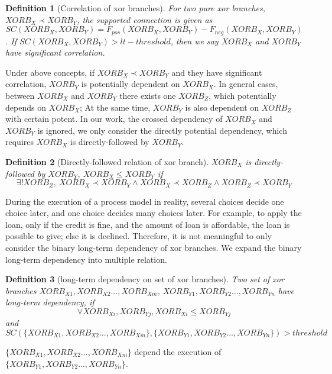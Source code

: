 \documentclass[]{article}
\newtheorem{mydef}{Definition}[section]
\begin{document}
\begin{mydef}[Correlation of xor branches]
	\label{def: supported-connection}
For two pure xor branches, $XORB_X \prec XORB_Y$, the supported connection is given as \[SC(XORB_X,XORB_Y)= F_{pos}(XORB_X, XORB_Y) -F_{neg}(XORB_X, XORB_Y)\]. If $SC(XORB_X,XORB_Y) > lt-threshold$, then we say $XORB_X$ and $XORB_Y$ have significant correlation.
\end{mydef}
Under above concepts, if $XORB_X \prec XORB_Y$ and they have significant correlation,  $XORB_Y$ is potentially dependent on  $XORB_X$. In general cases, between $XORB_X$ and $XORB_Y$ there exists one $XORB_Z$, which potentially depends on $XORB_X$; At the same time, $XORB_Y$ is also dependent on $XORB_Z$ with certain potent. In our work, the crossed dependency of $XORB_X$ and $XORB_Y$ is ignored, we only consider the directly potential dependency, which requires $XORB_X$ is directly-followed by $XORB_Y$. 
\begin{mydef}[Directly-followed relation of xor branch]
	$XORB_X$ is directly-followed by $XORB_Y$, $XORB_X \leq XORB_Y$ if 
	\[ \exists ! XORB_Z, \: XORB_X \prec XORB_Y \land XORB_X \prec XORB_Z \land XORB_Z \prec XORB_Y \]
\end{mydef}

During the execution of a process model in reality, several choices decide one choice later, and one choice decides many choices later. For example, to apply the loan, only if the credit is fine, and the amount of loan is affordable, the loan is possible to give; else it is declined. Therefore, it is not meaningful to only consider the binary long-term dependency of xor branches. We expand the binary long-term dependency into multiple relation. 
\begin{mydef}[long-term dependency on set of xor branches]
	\label{def: branches-final-lt}
	Two set of xor branches ${XORB_{X1}, XORB_{X2}..., XORB_{Xm}}$, ${XORB_{Y1}, XORB_{Y2}..., XORB_{Yn}}$ have long-term dependency, if 
	\[\forall XORB_{Xi},XORB_{Yj}, XORB_{Xi} \leq XORB_{Yj} \] and
	\[SC(\{XORB_{X1}, XORB_{X2}..., XORB_{Xm}\}, \{XORB_{Y1}, XORB_{Y2}..., XORB_{Yn}\}) > threshold  \]
\end{mydef}
$\{ XORB_{X1}, XORB_{X2}..., XORB_{Xm} \}$ depend the execution of $\{ XORB_{Y1}, XORB_{Y2}..., XORB_{Yn} \}$. 
\end{document}
